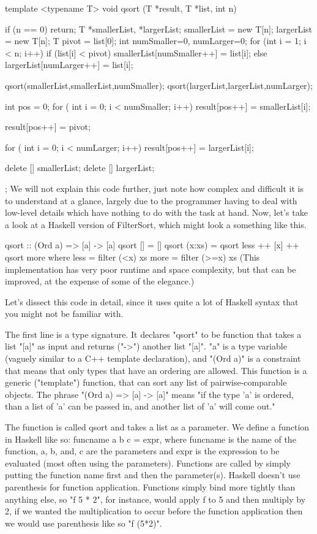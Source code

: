 \documentclass[main.tex]{subfiles}
\begin{document}
{{template <typename T>
void qsort (T *result, T *list, int n)
{
    if (n == 0) return;
    T *smallerList, *largerList;
    smallerList = new T[n];
    largerList = new T[n];      
    T pivot = list[0];
    int numSmaller=0, numLarger=0;      
    for (int i = 1; i < n; i++)
        if (list[i] < pivot)
            smallerList[numSmaller++] = list[i];
        else 
            largerList[numLarger++] = list[i];
    
    qsort(smallerList,smallerList,numSmaller); 
    qsort(largerList,largerList,numLarger);
    
    int pos = 0;        
    for ( int i = 0; i < numSmaller; i++)
        result[pos++] = smallerList[i];
    
    result[pos++] = pivot;
    
    for ( int i = 0; i < numLarger; i++)
        result[pos++] = largerList[i];
    
    delete [] smallerList;
    delete [] largerList;
};
We will not explain this code further, just note how complex and difficult it is to understand at a glance, largely due to the programmer having to deal with low-level details which have nothing to do with the task at hand. Now, let's take a look at a Haskell version of FilterSort, which might look a something like this.

qsort :: (Ord a) => [a] -> [a]
 qsort []     = []
 qsort (x:xs) = qsort less ++ [x] ++ qsort more
     where less = filter (<x)  xs
           more = filter (>=x) xs
(This implementation has very poor runtime and space complexity, but that can be improved, at the expense of some of the elegance.)

Let's dissect this code in detail, since it uses quite a lot of Haskell syntax that you might not be familiar with.

The first line is a type signature. It declares "qsort" to be function that takes a list "[a]" as input and returns ("->") another list "[a]". "a" is a type variable (vaguely similar to a C++ template declaration), and "(Ord a)" is a constraint that means that only types that have an ordering are allowed. This function is a generic ("template") function, that can sort any list of pairwise-comparable objects. The phrase "(Ord a) => [a] -> [a]" means "if the type 'a' is ordered, than a list of 'a' can be passed in, and another list of 'a' will come out."

The function is called qsort and takes a list as a parameter. We define a function in Haskell like so: funcname a b c = expr, where funcname is the name of the function, a, b, and, c are the parameters and expr is the expression to be evaluated (most often using the parameters). Functions are called by simply putting the function name first and then the parameter(s). Haskell doesn't use parenthesis for function application. Functions simply bind more tightly than anything else, so "f 5 * 2", for instance, would apply f to 5 and then multiply by 2, if we wanted the multiplication to occur before the function application then we would use parenthesis like so "f (5*2)".

}}
\end{document}
